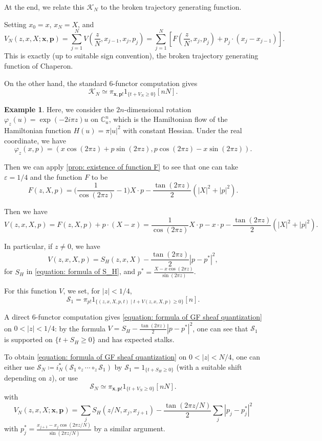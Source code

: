 \documentclass[11pt]{amsart}
\numberwithin{equation}{section}
\theoremstyle{plain}
\theoremstyle{definition}
\newtheorem{eg}[Eg]{Example}
\theoremstyle{remark}
\newcommand{\bC} { {\mathbb{C}}}
\newcommand{\cK} { {\mathcal{K}}}
\newcommand{\cS} { {\mathcal{S}}}
\begin{document}
At the end, we relate this $\cK_N$ to the broken trajectory generating function.

Setting
$x_0=x$, $x_N=X$, and
\[
V_N(z,x,X;\mathbf{x},\mathbf{p})
=
\sum_{j=1}^N
V\left(\frac{z}{N},x_{j-1},x_j,p_j\right)=\sum_{j=1}^N
\left[
F\left(\frac{z}{N},x_j,p_j\right)
+
 p_j\cdot (x_j-x_{j-1})
\right].
\]
This is exactly \cite[Equation (9.2.4)]{mcduff2017introST} (up to suitable sign convention), the broken trajectory generating function of Chaperon.

On the other hand, the standard 6-functor computation gives
\[
\cK_N
\simeq
\pi_{\mathbf{x},\mathbf{p}!}
1_{\{t+V_N\geq 0\}}[nN].
\]

\begin{eg}\label{eg: rotation quantization using V-type GF}Here, we consider the $2n$-dimensional rotation $\varphi_z(u)=\exp{(-2i\pi z)}u$ on $\bC^n_u$, which is the Hamiltonian flow of the Hamiltonian function $H(u)=\pi|u|^2 $ with constant Hessian. Under the real coordinate, we have
\[\varphi_z(x,p)=(x\cos(2\pi z)+p\sin(2\pi z),p\cos(2\pi z)-x\sin(2\pi z)).\]

Then we can apply \autoref{prop: existence of function F} to see that one can take $\varepsilon=1/4$ and the function $F$ to be 
\[F(z,X,p)=\Big(\frac{1}{\cos(2\pi z)}-1\Big) X\cdot p-\frac{\tan(2\pi z)}{2} (|X|^2+|p|^2).\]

Then we have
\[V(z,x,X,p)=F(z,X,p)+p\cdot(X-x)=\frac{1}{\cos(2\pi z)} X\cdot p - x\cdot p-\frac{\tan(2\pi z)}{2} (|X|^2+|p|^2).\]

In particular, if $z\neq 0$, we have
 \[V(z,x,X,p)=S_H(z,x,X)-\frac{\tan(2\pi z)}{2}\left| p- p^*\right|^2,\]  
for $S_H$ in \autoref{equation: formula of S_H}, and $p^*=\frac{X-x\cos(2\pi z)}{\sin(2\pi z)}$.

For this function $V$, we set, for $|z|<1/4$,  
\[\cS_1=\pi_{p!}1_{\{(z,x,X,p,t)\mid t+V(z,x,X,p)\geq 0\}}[n].\]

A direct 6-functor computation gives \autoref{equation: formula of GF sheaf quantization} on $0<|z|<1/4$: by the formula $V=S_H-\frac{\tan(2\pi z)}{2}\left| p- p^*\right|^2$, one can see that $\cS_1$ is supported on $\{t+S_H\geq 0\}$ and has expected stalks. 

To obtain \autoref{equation: formula of GF sheaf quantization} on $0<|z|<N/4$, one can either use $\cS_N\coloneqq i_{N}^*(\cS_1\circ_{z} \cdots \circ_z\cS_1 )$ by $\cS_1=1_{\{ t+S_H\geq 0\}}$ (with a suitable shift depending on $z$), or use 
\[
\cS_N
\simeq
\pi_{\mathbf{x},\mathbf{p}!}
1_{\{t+V_N\geq 0\}}[nN].
\]
with
\[V_N(z,x,X;\mathbf{x},\mathbf{p})=\sum _j S_H(z/N,x_j,x_{j+1})-\frac{\tan(2\pi z/N)}{2}\sum_j\left| p_j- p^*_j\right|^2\]
with $p_j^*=\frac{x_{j+1}-x_j\cos(2\pi z/N)}{\sin(2\pi z/N)}$ by a similar argument.
\end{eg}
\end{document}
